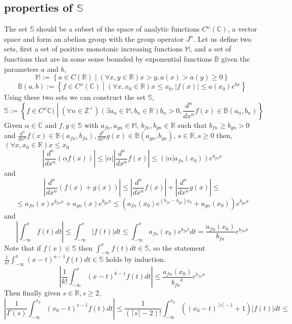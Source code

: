 \documentclass[%
 onecolumn,
 amsmath, amssymb, aps, pra, 10pt
]{revtex4-2}
\begin{document}
\subsection{properties of $\mathbb{S}$}

The set $\mathbb{S}$ should be a subset of the space of analytic functions $C^\omega(\mathbb{C})$, a vector space and form an abelian group with the group operator $J^n$. Let us define two sets, first a set of positive monotonic increasing functions $\mathbb{M}$, and a set of functions that are in some sense bounded by exponential functions $\mathbb{B}$ given the parameters $a$ and $b$,
\[\mathbb{M} := \left\lbrace a \in C(\mathbb{R}) \middle| (\forall x, y \in \mathbb{R}) x > y, a(x) > a(y) \geq 0 \right\rbrace\]
\[\mathbb{B}(a, b) := \left\lbrace f \in C^\omega(\mathbb{C}) \middle| (\forall x, x_0 \in \mathbb{R}) x \leq x_0, |f(x)| \leq a(x_0)e^{bx} \right\rbrace\]
Using these two sets we can construct the set $\mathbb{S}$,
\[
\mathbb{S} := \left\lbrace f \in C^\omega\mathbb{C}) \middle| (\forall n \in \mathbb{Z}^+)(\exists a_n \in \mathbb{M}, b_n \in \mathbb{R}) b_n > 0, \frac{d^n}{dx^n}f(x) \in \mathbb{B}(a_n, b_n) \right\rbrace
\]
Given $\alpha \in \mathbb{C}$ and $f, g \in \mathbb{S}$ with $a_{fn}, a_{gn} \in \mathbb{M}$, $ b_{fn}, b_{gn} \in \mathbb{R}$ such that $b_{fn} \geq b_{gn} > 0$ and $\frac{d^n}{dx^n} f(x) \in \mathbb{B}(a_{fn}, b_{fn}), \frac{d^n}{dx^n} g(x) \in \mathbb{B}(a_{gn}, b_{gn})$, $s \in \mathbb{R}, s \geq 0$ then, $(\forall x, x_0 \in \mathbb{R}) x \leq x_0$
\[\left|\frac{d^n}{dx^n} (\alpha f(x))\right| \leq |\alpha| \left|\frac{d^n}{dx^n}f(x)\right| \leq (|\alpha| a_{fn}(x_0))e^{b_{fn}x}\]
and
\[\left|\frac{d^n}{dx^n}(f(x) + g(x))\right| \leq \left|\frac{d^n}{dx^n} f(x)\right| + \left|\frac{d^n}{dx^n} g(x)\right| \leq \]
\[\leq a_{fn}(x)e^{b_{fn}x} + a_{gn}(x)e^{b_{gn}x} \leq \left(a_{fn}(x_0)e^{(b_{fn} - b_{gn})x_0} + a_{gn}(x_0)\right)e^{b_{gn}x}\]
and
\[\left|\int_{-\infty}^x f(t)dt\right| \leq \int_{-\infty}^x \left|f(t)\right| dt \leq \int_{-\infty}^x a_{fn}(x_0)e^{b_{fn}t}dt = \frac{a_{fn}(x_0)}{b_{fn}}e^{b_{fn}x}\]
Note that if $f(x) \in \mathbb{S}$ then $\int_{-\infty}^x f(t)dt \in \mathbb{S}$, so the statement $\frac{1}{n!}\int_{-\infty}^x (x - t)^{n - 1}f(t)dt \in \mathbb{S}$ holds by induction.
\[\left|\frac{1}{k!}\int_{-\infty}^x (x - t)^{k - 1}f(t)dt\right| \leq \frac{a_{fn}(x_0)}{{b_{fn}}^k}e^{b_{fn}x}\]
Then finally given $s \in \mathbb{R}, s \geq 2$,
\[\left|\frac{1}{\Gamma(s)} \int_{-\infty}^{x_0} (x_0 - t)^{s-1} f(t)dt\right| \leq \frac{1}{(\lceil s \rceil - 2)!} \int_{-\infty}^{x_0} \left((x_0 - t)^{\lceil s \rceil -1} + 1\right) \left|f(t)\right|dt \leq \]
\end{document}
